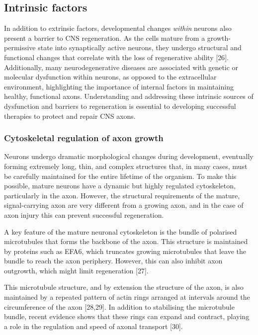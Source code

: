 \documentclass[
  12pt,
  a4paper,
]{book}
\begin{document}
\subsection{Intrinsic factors}\label{intrinsic-factors}

In addition to extrinsic factors, developmental changes \emph{within} neurons also present a barrier to CNS regeneration. As the cells mature from a growth-permissive state into synaptically active neurons, they undergo structural and functional changes that correlate with the loss of regenerative ability {[}26{]}. Additionally, many neurodegenerative diseases are associated with genetic or molecular dysfunction within neurons, as opposed to the extracellular environment, highlighting the importance of internal factors in maintaining healthy, functional axons. Understanding and addressing these intrinsic sources of dysfunction and barriers to regeneration is essential to developing successful therapies to protect and repair CNS axons.

\subsubsection{Cytoskeletal regulation of axon growth}\label{cytoskeletal-regulation-of-axon-growth}

Neurons undergo dramatic morphological changes during development, eventually forming extremely long, thin, and complex structures that, in many cases, must be carefully maintained for the entire lifetime of the organism. To make this possible, mature neurons have a dynamic but highly regulated cytoskeleton, particularly in the axon. However, the structural requirements of the mature, signal-carrying axon are very different from a growing axon, and in the case of axon injury this can prevent successful regeneration.

A key feature of the mature neuronal cytoskeleton is the bundle of polarised microtubules that forms the backbone of the axon. This structure is maintained by proteins such as EFA6, which truncates growing microtubules that leave the bundle to reach the axon periphery. However, this can also inhibit axon outgrowth, which might limit regeneration {[}27{]}.

This microtubule structure, and by extension the structure of the axon, is also maintained by a repeated pattern of actin rings arranged at intervals around the circumference of the axon {[}28,29{]}. In addition to stabilising the microtubule bundle, recent evidence shows that these rings can expand and contract, playing a role in the regulation and speed of axonal transport {[}30{]}.
\end{document}
